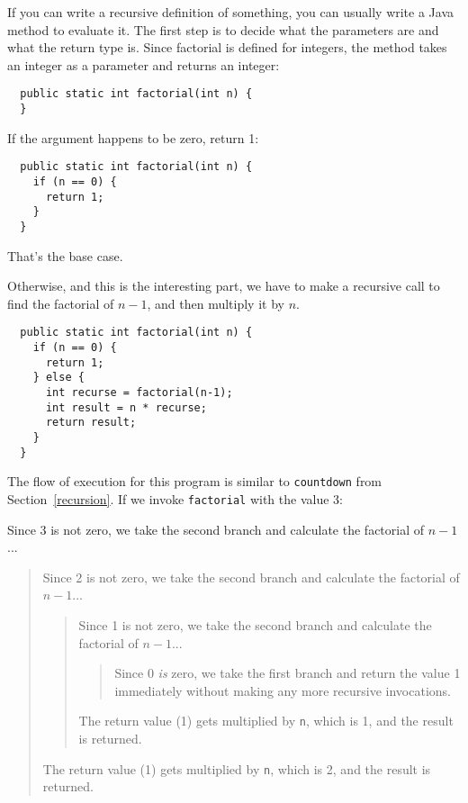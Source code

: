 \documentclass[12pt]{book}
\theoremstyle{definition}
\begin{document}
If you can write a recursive definition of something, you can usually
write a Java method to evaluate it.  The first step is to decide what
the parameters are and what the return type is.  Since factorial is
defined for integers, the method takes an
integer as a parameter and returns an integer:

\begin{lstlisting}
  public static int factorial(int n) {
  }
\end{lstlisting}

\noindent If the argument happens to be zero, return 1:

\begin{lstlisting}
  public static int factorial(int n) {
    if (n == 0) {
      return 1;
    }
  }
\end{lstlisting}
%
That's the base case.

Otherwise, and this is the interesting part, we have to make
a recursive call to find the factorial of $n-1$, and then
multiply it by $n$.

\begin{lstlisting}
  public static int factorial(int n) {
    if (n == 0) {
      return 1;
    } else {
      int recurse = factorial(n-1);
      int result = n * recurse;
      return result;
    }
  }
\end{lstlisting}
%
The flow of execution for this program is similar to {\tt countdown}
from Section~\ref{recursion}.
If we invoke {\tt factorial} with the value 3:

Since 3 is not zero, we take the second branch and calculate
the factorial of $n-1$...

\begin{quote}
Since 2 is not zero, we take the second branch and calculate
the factorial of $n-1$...

\begin{quote}
Since 1 is not zero, we take the second branch and calculate
the factorial of $n-1$...

\begin{quote}
Since 0 {\em is} zero, we take the first branch and return
the value 1 immediately without making any more recursive
invocations.

\end{quote}

The return value (1) gets multiplied by {\tt n}, which is 1,
and the result is returned.

\end{quote}

The return value (1) gets multiplied by {\tt n}, which is 2,
and the result is returned.

\end{quote}
\end{document}
